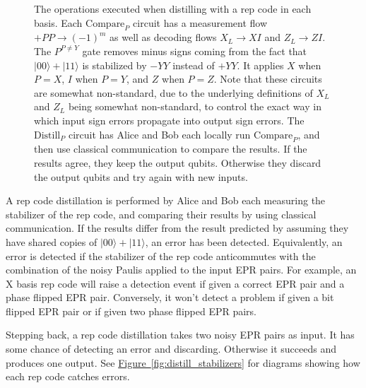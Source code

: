 \documentclass[onecolumn,unpublished,a4paper]{quantumarticle}
\theoremstyle{definition}
\theoremstyle{definition}
\theoremstyle{definition}
\newcommand{\fig}[1]{\hyperref[fig:#1]{Figure~\ref*{fig:#1}}}
\begin{document}
\begin{figure}
    \centering
    \caption{
        The operations executed when distilling with a rep code in each basis.
        Each $\text{Compare}_P$ circuit has a measurement flow $+PP \rightarrow (-1)^m$ as well as decoding flows $X_L \rightarrow XI$ and $Z_L \rightarrow ZI$.
        The $P^{P\neq Y}$ gate removes minus signs coming from the fact that $|00\rangle + |11\rangle$ is stabilized by $-YY$ instead of $+YY$.
        It applies $X$ when $P=X$, $I$ when $P=Y$, and $Z$ when $P=Z$.
        Note that these circuits are somewhat non-standard, due to the underlying definitions of $X_L$ and $Z_L$ being somewhat non-standard, to control the exact way in which input sign errors propagate into output sign errors.
        The $\text{Distill}_P$ circuit has Alice and Bob each locally run $\text{Compare}_P$, and then use classical communication to compare the results.
        If the results agree, they keep the output qubits.
        Otherwise they discard the output qubits and try again with new inputs.
    }
    \label{fig:distill_blocks}
\end{figure}

A rep code distillation is performed by Alice and Bob each measuring the stabilizer of the rep code, and comparing their results by using classical communication.
If the results differ from the result predicted by assuming they have shared copies of $|00\rangle + |11\rangle$, an error has been detected.
Equivalently, an error is detected if the stabilizer of the rep code anticommutes with the combination of the noisy Paulis applied to the input EPR pairs.
For example, an X basis rep code will raise a detection event if given a correct EPR pair and a phase flipped EPR pair.
Conversely, it won't detect a problem if given a bit flipped EPR pair or if given two phase flipped EPR pairs.

Stepping back, a rep code distillation takes two noisy EPR pairs as input.
It has some chance of detecting an error and discarding.
Otherwise it succeeds and produces one output.
See \fig{distill_stabilizers} for diagrams showing how each rep code catches errors.
\end{document}
